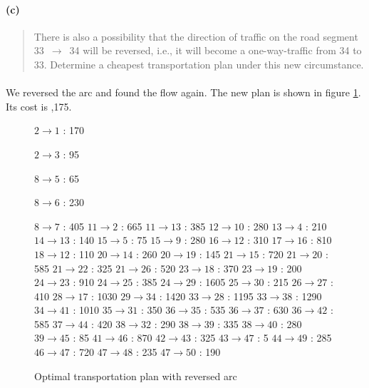\paragraph{(c)}
\begin{quote}
There is also a possibility that the direction of traffic on the road segment 33~$\rightarrow$~34 will be reversed, i.e., it will become a one-way-traffic from 34 to 33. Determine a cheapest transportation plan under this new circumstance.
\end{quote}

\paragraph{}
We reversed the arc and found the flow again. The new plan is shown in figure \ref{flow3-1c}. Its cost is ,175.

\begin{figure}[H]
\centering
\begin{multicols}{5}
$ 2 \rightarrow 1 $ : 170

$ 2 \rightarrow 3 $ : 95

$ 8 \rightarrow 5 $ : 65

$ 8 \rightarrow 6 $ : 230

$ 8 \rightarrow 7 $ : 405
$ 11 \rightarrow 2 $ : 665
$ 11 \rightarrow 13 $ : 385
$ 12 \rightarrow 10 $ : 280
$ 13 \rightarrow 4 $ : 210
$ 14 \rightarrow 13 $ : 140
$ 15 \rightarrow 5 $ : 75
$ 15 \rightarrow 9 $ : 280
$ 16 \rightarrow 12 $ : 310
$ 17 \rightarrow 16 $ : 810
$ 18 \rightarrow 12 $ : 110
$ 20 \rightarrow 14 $ : 260
$ 20 \rightarrow 19 $ : 145
$ 21 \rightarrow 15 $ : 720
$ 21 \rightarrow 20 $ : 585
$ 21 \rightarrow 22 $ : 325
$ 21 \rightarrow 26 $ : 520
$ 23 \rightarrow 18 $ : 370
$ 23 \rightarrow 19 $ : 200
$ 24 \rightarrow 23 $ : 910
$ 24 \rightarrow 25 $ : 385
$ 24 \rightarrow 29 $ : 1605
$ 25 \rightarrow 30 $ : 215
$ 26 \rightarrow 27 $ : 410
$ 28 \rightarrow 17 $ : 1030
$ 29 \rightarrow 34 $ : 1420
$ 33 \rightarrow 28 $ : 1195
$ 33 \rightarrow 38 $ : 1290
$ 34 \rightarrow 41 $ : 1010
$ 35 \rightarrow 31 $ : 350
$ 36 \rightarrow 35 $ : 535
$ 36 \rightarrow 37 $ : 630
$ 36 \rightarrow 42 $ : 585
$ 37 \rightarrow 44 $ : 420
$ 38 \rightarrow 32 $ : 290
$ 38 \rightarrow 39 $ : 335
$ 38 \rightarrow 40 $ : 280
$ 39 \rightarrow 45 $ : 85
$ 41 \rightarrow 46 $ : 870
$ 42 \rightarrow 43 $ : 325
$ 43 \rightarrow 47 $ : 5
$ 44 \rightarrow 49 $ : 285
$ 46 \rightarrow 47 $ : 720
$ 47 \rightarrow 48 $ : 235
$ 47 \rightarrow 50 $ : 190
\end{multicols}
\caption{Optimal transportation plan with reversed arc}
\label{flow3-1c}
\end{figure}
